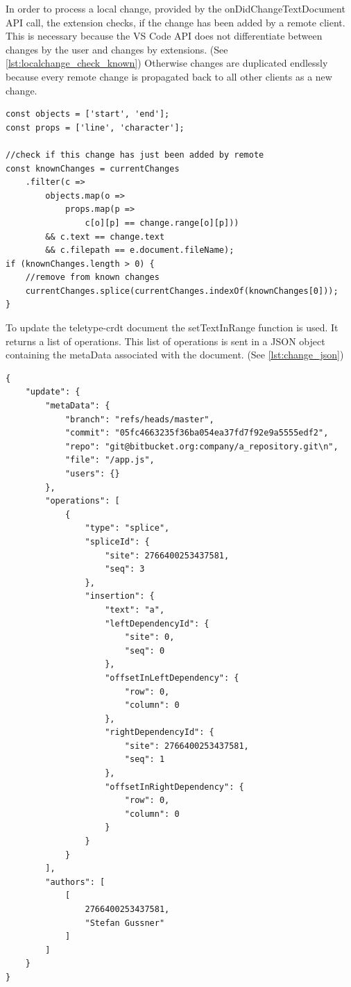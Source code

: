 In order to process a local change, provided by the onDidChangeTextDocument API call, the extension checks, if the change has been added by a remote client. This is necessary because the VS Code API does not differentiate between changes by the user and changes by extensions. (See \autoref{lst:localchange_check_known}) Otherwise changes are duplicated endlessly because every remote change is propagated back to all other clients as a new change.

\begin{lstlisting}[label={lst:localchange_check_known}, caption=Is This Change Already Known to The Data Model? ]
const objects = ['start', 'end'];
const props = ['line', 'character'];

//check if this change has just been added by remote
const knownChanges = currentChanges
    .filter(c => 
        objects.map(o => 
            props.map(p => 
                c[o][p] == change.range[o][p])) 
        && c.text == change.text 
        && c.filepath == e.document.fileName);
if (knownChanges.length > 0) {
    //remove from known changes
    currentChanges.splice(currentChanges.indexOf(knownChanges[0]));
}
\end{lstlisting}

To update the teletype-crdt document the setTextInRange function is used. It returns a list of operations. This list of operations is sent in a JSON object containing the metaData associated with the document. (See \autoref{lst:change_json})

\begin{lstlisting}[label={lst:change_json}, caption=Network Data Packet]
{
    "update": {
        "metaData": {
            "branch": "refs/heads/master",
            "commit": "05fc4663235f36ba054ea37fd7f92e9a5555edf2",
            "repo": "git@bitbucket.org:company/a_repository.git\n",
            "file": "/app.js",
            "users": {}
        },
        "operations": [
            {
                "type": "splice",
                "spliceId": {
                    "site": 2766400253437581,
                    "seq": 3
                },
                "insertion": {
                    "text": "a",
                    "leftDependencyId": {
                        "site": 0,
                        "seq": 0
                    },
                    "offsetInLeftDependency": {
                        "row": 0,
                        "column": 0
                    },
                    "rightDependencyId": {
                        "site": 2766400253437581,
                        "seq": 1
                    },
                    "offsetInRightDependency": {
                        "row": 0,
                        "column": 0
                    }
                }
            }
        ],
        "authors": [
            [
                2766400253437581,
                "Stefan Gussner"
            ]
        ]
    }
}
\end{lstlisting}

